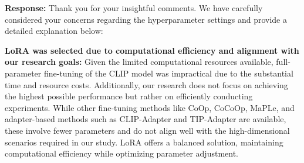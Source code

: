 \documentclass[a4paper,twoside,11pt,dvipsnames]{reviewresponse}
\begin{document}

\textbf{Response:} 
Thank you for your insightful comments. We have carefully considered your concerns regarding the hyperparameter settings and provide a detailed explanation below:

\textbf{LoRA was selected due to computational efficiency and alignment with our research goals:}
Given the limited computational resources available, full-parameter fine-tuning of the CLIP model was impractical due to the substantial time and resource costs. Additionally, our research does not focus on achieving the highest possible performance but rather on efficiently conducting experiments. While other fine-tuning methods like CoOp\cite{zhou2022learning}, CoCoOp\cite{zhou2022conditional}, MaPLe, and adapter-based methods such as CLIP-Adapter\cite{gao2024clip} and TIP-Adapter\cite{zhang2021tip} are available, these involve fewer parameters and do not align well with the high-dimensional scenarios required in our study. LoRA offers a balanced solution, maintaining computational efficiency while optimizing parameter adjustment.
\end{document}
